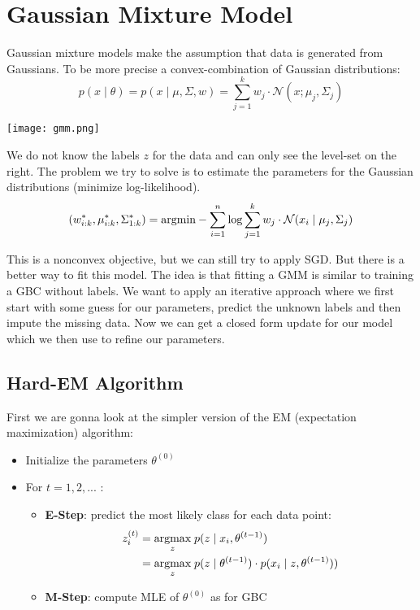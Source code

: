 \section{Gaussian Mixture Model}

Gaussian mixture models make the assumption that data is generated from Gaussians. To be more precise a convex-combination of Gaussian distributions:
$$p(x \; | \; \theta) = p(x \; | \; \mu, \Sigma, w) = \sum_{j=1}^k w_j \cdot \mathcal{N}(x; \mu_j, \Sigma_j)$$

\begin{center}
	\texttt{[image: gmm.png]}
\end{center}

We do not know the labels $z$ for the data and can only see the level-set on the right. The problem we try to solve is to estimate the parameters for the Gaussian distributions (minimize log-likelihood).
$$(w_{i:k}^*, \mu_{i:k}^*, \Sigma_{1:k}^*) = \underset{\;}{\text{argmin}} - \sum_{i=1}^n \log \sum_{j=1}^k w_j \cdot \mathcal{N}(x_i \; | \; \mu_j, \Sigma_j)$$

This is a nonconvex objective, but we can still try to apply SGD. But there is a better way to fit this model. The idea is that fitting a GMM is similar to training a GBC without labels. We want to apply an iterative approach where we first start with some guess for our parameters, predict the unknown labels and then impute the missing data. Now we can get a closed form update for our model which we then use to refine our parameters.

\subsection{Hard-EM Algorithm}

First we are gonna look at the simpler version of the EM (expectation maximization) algorithm:
\begin{itemize}
	\item Initialize the parameters $\theta^{(0)}$
	\item For $t = 1,2,...$ :
		\begin{itemize}
			\item \textbf{E-Step}: predict the most likely class for each data point:
				\begin{align*}
					z_i^{(t)} &= \underset{z}{\text{argmax}} \; p(z \; | \; x_i, \theta^{(t-1)}) \\
					&= \underset{z}{\text{argmax}} \; p(z \; | \; \theta^{(t-1)}) \cdot p(x_i \; | \; z, \theta^{(t-1)}))
				\end{align*}
			\item \textbf{M-Step}: compute MLE of $\theta^{(0)}$ as for GBC
		\end{itemize}
\end{itemize}

